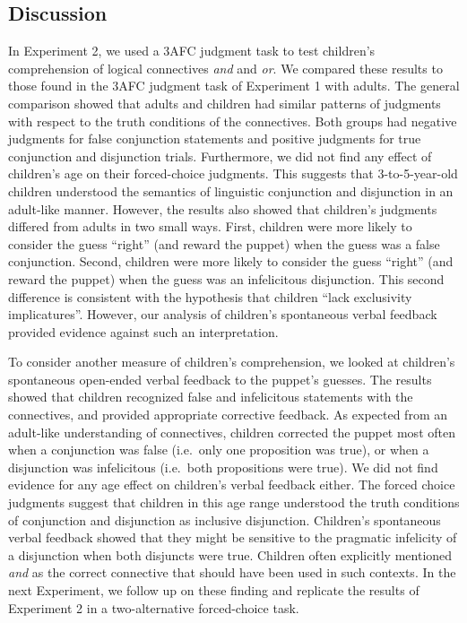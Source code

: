 \documentclass[,man,floatsintext]{apa6}
\begin{document}
\hypertarget{discussion-1}{%
\subsection{Discussion}\label{discussion-1}}

In Experiment 2, we used a 3AFC judgment task to test children's comprehension of logical connectives \emph{and} and \emph{or}. We compared these results to those found in the 3AFC judgment task of Experiment 1 with adults. The general comparison showed that adults and children had similar patterns of judgments with respect to the truth conditions of the connectives. Both groups had negative judgments for false conjunction statements and positive judgments for true conjunction and disjunction trials. Furthermore, we did not find any effect of children's age on their forced-choice judgments. This suggests that 3-to-5-year-old children understood the semantics of linguistic conjunction and disjunction in an adult-like manner. However, the results also showed that children's judgments differed from adults in two small ways. First, children were more likely to consider the guess \enquote{right} (and reward the puppet) when the guess was a false conjunction. Second, children were more likely to consider the guess \enquote{right} (and reward the puppet) when the guess was an infelicitous disjunction. This second difference is consistent with the hypothesis that children \enquote{lack exclusivity implicatures}. However, our analysis of children's spontaneous verbal feedback provided evidence against such an interpretation.

To consider another measure of children's comprehension, we looked at children's spontaneous open-ended verbal feedback to the puppet's guesses. The results showed that children recognized false and infelicitous statements with the connectives, and provided appropriate corrective feedback. As expected from an adult-like understanding of connectives, children corrected the puppet most often when a conjunction was false (i.e.~only one proposition was true), or when a disjunction was infelicitous (i.e.~both propositions were true). We did not find evidence for any age effect on children's verbal feedback either. The forced choice judgments suggest that children in this age range understood the truth conditions of conjunction and disjunction as inclusive disjunction. Children's spontaneous verbal feedback showed that they might be sensitive to the pragmatic infelicity of a disjunction when both disjuncts were true. Children often explicitly mentioned \emph{and} as the correct connective that should have been used in such contexts. In the next Experiment, we follow up on these finding and replicate the results of Experiment 2 in a two-alternative forced-choice task.
\end{document}
